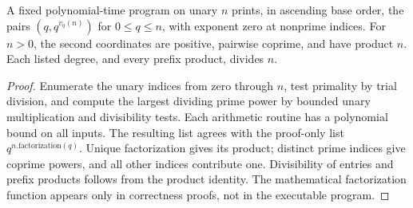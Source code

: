 \begin{lemma}
\label{lem:binary-degree-decomposition}
\leanok
A fixed polynomial-time program on unary $n$ prints, in ascending base order,
the pairs $(q,q^{v_q(n)})$ for $0\leq q\leq n$, with exponent zero at nonprime
indices. For $n>0$, the second coordinates are positive, pairwise coprime, and
have product $n$. Each listed degree, and every prefix product, divides $n$.
\end{lemma}
\begin{proof}
\leanok
Enumerate the unary indices from zero through $n$, test primality by trial
division, and compute the largest dividing prime power by bounded unary
multiplication and divisibility tests. Each arithmetic routine has a polynomial
bound on all inputs. The resulting list agrees with the proof-only list
$q^{n.\mathrm{factorization}(q)}$. Unique factorization gives its product;
distinct prime indices give coprime powers, and all other indices contribute
one. Divisibility of entries and prefix products follows from the product
identity. The mathematical factorization function appears only in correctness
proofs, not in the executable program.
\end{proof}

